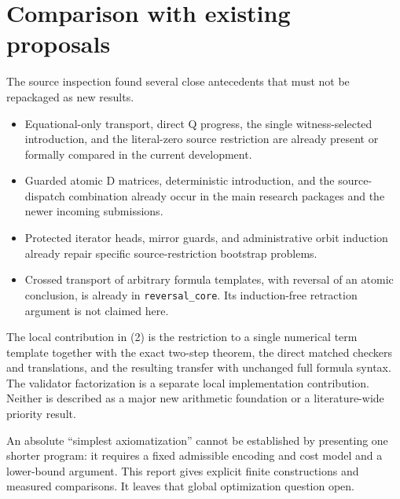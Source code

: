 \documentclass[11pt,letterpaper]{article}
\theoremstyle{definition}\newtheorem{definition}[theorem]{Definition}
\theoremstyle{remark}\newtheorem{remark}[theorem]{Remark}
\newcommand{\file}[1]{\texttt{\nolinkurl{#1}}}
\begin{document}
\section{Comparison with existing proposals}
The source inspection found several close antecedents that must not be
repackaged as new results.
\begin{itemize}
\item Equational-only transport, direct Q progress, the single
  witness-selected introduction, and the literal-zero source restriction
  are already present or formally compared in the current development.
\item Guarded atomic D matrices, deterministic introduction, and the
  source-dispatch combination already occur in the main research packages
  and the newer incoming submissions.
\item Protected iterator heads, mirror guards, and administrative orbit
  induction already repair specific source-restriction bootstrap problems.
\item Crossed transport of arbitrary formula templates, with reversal of
  an atomic conclusion, is already in \file{reversal_core}. Its
  induction-free retraction argument is not claimed here.
\end{itemize}
The local contribution in (2) is the restriction to a single numerical
term template together with the exact two-step theorem, the direct matched
checkers and translations, and the resulting transfer with unchanged
full formula syntax. The validator factorization is a separate local
implementation contribution. Neither is described as a major new
arithmetic foundation or a literature-wide priority result.

An absolute ``simplest axiomatization'' cannot be established by presenting
one shorter program: it requires a fixed admissible encoding and cost
model and a lower-bound argument. This report gives explicit finite
constructions and measured comparisons. It leaves that global optimization
question open.
\end{document}

